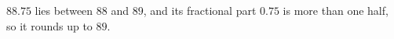 $88.75$ lies between $88$ and $89$, and its fractional part $0.75$ is more than one half, so it rounds up to $\boxed{89}$.
